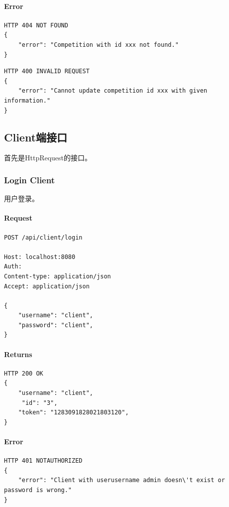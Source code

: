 \documentclass{article}
\begin{document}
\paragraph*{Error}
\begin{lstlisting}
HTTP 404 NOT FOUND
{
    "error": "Competition with id xxx not found."
}
\end{lstlisting}

\begin{lstlisting}
HTTP 400 INVALID REQUEST
{
    "error": "Cannot update competition id xxx with given information."
}
\end{lstlisting}

\subsection{Client端接口}
首先是HttpRequest的接口。

\subsubsection{Login Client}
用户登录。

\paragraph*{Request}
\begin{lstlisting}
POST /api/client/login

Host: localhost:8080
Auth:
Content-type: application/json
Accept: application/json

{
    "username": "client",
    "password": "client",
}
\end{lstlisting}

\paragraph*{Returns}
\begin{lstlisting}
HTTP 200 OK
{
    "username": "client",
     "id": "3",
    "token": "1283091828021803120",
}

\end{lstlisting}

\paragraph*{Error}
\begin{lstlisting}
HTTP 401 NOTAUTHORIZED
{
    "error": "Client with userusername admin doesn\'t exist or password is wrong."
}
\end{lstlisting}
\end{document}
